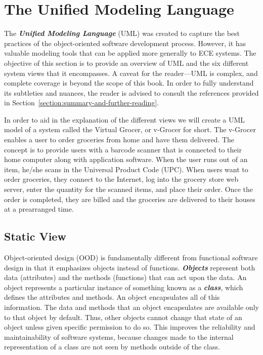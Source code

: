 \section{The Unified Modeling Language}
\label{section:the-unified-modeling-language}

The \emph{\textbf{Unified Modeling Language}} (UML) was created to
capture the best practices of the object-oriented software development
process. However, it has valuable modeling tools that can be applied
more generally to ECE systems. The objective of this section is to
provide an overview of UML and the six different system views that it
encompasses. A caveat for the reader---UML is complex, and complete
coverage is beyond the scope of this book. In order to fully understand
its subtleties and nuances, the reader is advised to consult the
references provided in Section~\ref{section:summary-and-further-reading}.

In order to aid in the explanation of the different views we will create
a UML model of a system called the Virtual Grocer, or v-Grocer for
short. The v-Grocer enables a user to order groceries from home and have
them delivered. The concept is to provide users with a barcode scanner
that is connected to their home computer along with application
software. When the user runs out of an item, he/she scans in the
Universal Product Code (UPC). When users want to order groceries, they
connect to the Internet, log into the grocery store web server, enter
the quantity for the scanned items, and place their order. Once the
order is completed, they are billed and the groceries are delivered to
their houses at a prearranged time.

\subsection{Static View}
\label{subsection:static-view}

Object-oriented design (OOD) is fundamentally different from functional
software design in that it emphasizes objects instead of functions.
\emph{\textbf{Objects}} represent both data (attributes) and the methods
(functions) that can act upon the data. An object represents a
particular instance of something known as a \emph{\textbf{class}}, which
defines the attributes and methods. An object encapsulates all of this
information. The data and methods that an object encapsulates are
available only to that object by default. Thus, other objects cannot
change that state of an object unless given specific permission to do
so. This improves the reliability and maintainability of software
systems, because changes made to the internal representation of a class
are not seen by methods outside of the class.

